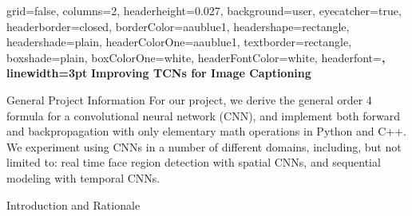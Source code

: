 \documentclass[paperwidth=24in,paperheight=48in, fontscale=0.4166666666666]{baposter}
\begin{document}
\begin{poster}{
  grid=false,
  columns=2,
  headerheight=0.027\textheight,
  background=user,
  eyecatcher=true,
  headerborder=closed,
  borderColor=aaublue1,
  headershape=rectangle,
  headershade=plain,
  headerColorOne=aaublue1,
  textborder=rectangle,
  boxshade=plain,
  boxColorOne=white,
  headerFontColor=white,
  headerfont=\Large\sf\bf,
  linewidth=3pt
}
{
}
{\color{white}\bf
\vspace{12pt}
  Improving TCNs for Image Captioning
}
{
}



\begin{posterbox}[name=project,column=0, row=0, headerColorOne = blackcolor, headerColorTwo = blackcolor, borderColor = blackcolor]{General Project Information}
\vspace{-2pt}
For our project, we derive the general order 4 formula for a convolutional neural network (CNN), and implement both forward and backpropagation with only elementary math operations in Python and C++. We experiment using CNNs in a number of different domains, including, but not limited to: real time face region detection with spatial CNNs, and sequential modeling with temporal CNNs.
\end{posterbox}








\begin{posterbox}[name=intro,column=0, below=project]{Introduction and Rationale}
\scalebox{0.00000000000000000001}{

}
\end{posterbox}
\end{poster}
\end{document}
